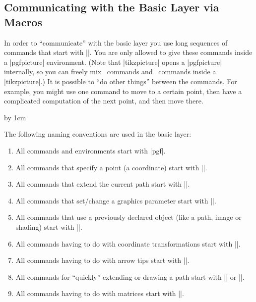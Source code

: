 \subsection{Communicating with the Basic Layer via Macros}

In order to ``communicate'' with the basic layer you use long sequences of
commands that start with |\pgf|. You are only allowed to give these commands
inside a |{pgfpicture}| environment. (Note that |{tikzpicture}| opens a
|{pgfpicture}| internally, so you can freely mix \pgfname\ commands and
\tikzname\ commands inside a |{tikzpicture}|.) It is possible to ``do other
things'' between the commands. For example, you might use one command to move
to a certain point, then have a complicated computation of the next point, and
then move there.
%
\begin{codeexample}[]
\newdimen\myypos
\begin{pgfpicture}
  \pgfpathmoveto{\pgfpoint{0cm}{\myypos}}
  \pgfpathlineto{\pgfpoint{1cm}{\myypos}}
  \advance \myypos by 1cm
  \pgfpathlineto{\pgfpoint{1cm}{\myypos}}
  \pgfpathclose
\end{pgfpicture}
\end{codeexample}

The following naming conventions are used in the basic layer:
%
\begin{enumerate}
    \item All commands and environments start with |pgf|.
    \item All commands that specify a point (a coordinate) start with
        |\pgfpoint|.
    \item All commands that extend the current path start with |\pgfpath|.
    \item All commands that set/change a graphics parameter start with
        |\pgfset|.
    \item All commands that use a previously declared object (like a path,
        image or shading) start with |\pgfuse|.
    \item All commands having to do with coordinate transformations start with
        |\pgftransform|.
    \item All commands having to do with arrow tips start with |\pgfarrows|.
    \item All commands for ``quickly'' extending or drawing a path start with
        |\pgfpathq| or |\pgfusepathq|.
    \item All commands having to do with matrices start with |\pgfmatrix|.
\end{enumerate}


